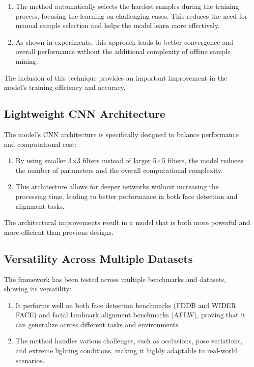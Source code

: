 \documentclass{report}
\begin{document}
	\begin{enumerate}
		\item 
		The method automatically selects the hardest samples during the training process, focusing the learning on challenging cases. This reduces the need for manual sample selection and helps the model learn more effectively.
		
		\item 
		As shown in experiments, this approach leads to better convergence and overall performance without the additional complexity of offline sample mining.
	\end{enumerate}
	The inclusion of this technique provides an important improvement in the model’s training efficiency and accuracy.
	
	
	\subsection{Lightweight CNN Architecture}
	The model's CNN architecture is specifically designed to balance performance and computational cost:
	
	\begin{enumerate}
		\item 
		By using smaller 3×3 filters instead of larger 5×5 filters, the model reduces the number of parameters and the overall computational complexity.
		
		\item 
		This architecture allows for deeper networks without increasing the processing time, leading to better performance in both face detection and alignment tasks.
	\end{enumerate}
	The architectural improvements result in a model that is both more powerful and more efficient than previous designs.
	
	
	\subsection{Versatility Across Multiple Datasets}
	The framework has been tested across multiple benchmarks and datasets, showing its versatility:
	
	\begin{enumerate}
		\item 
		It performs well on both face detection benchmarks (FDDB and WIDER FACE) and facial landmark alignment benchmarks (AFLW), proving that it can generalize across different tasks and environments.
		
		\item 
		The method handles various challenges, such as occlusions, pose variations, and extreme lighting conditions, making it highly adaptable to real-world scenarios.
	\end{enumerate}
	
\end{document}

